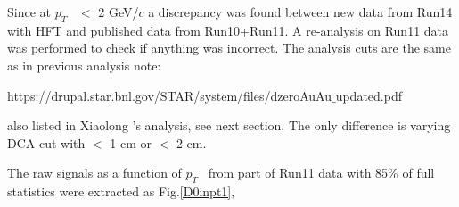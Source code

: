 
\newcommand{\ttbs}{\char'134}
\newcommand{\pt}{$p_{T}$ }
\newcommand{ \bfg }{\begin{figure}[]}
\newcommand{ \efg }{\end{figure}}
\newcommand{\dzero}{$D^{0}$ }




Since at \pt\ $<$ 2 GeV/$c$ a discrepancy was found between new data from Run14 with HFT and published data from Run10+Run11. A re-analysis on Run11 data was performed to check if anything was incorrect. The analysis cuts are the same as in previous analysis note:

https://drupal.star.bnl.gov/STAR/system/files/dzeroAuAu$\_$updated.pdf

also listed in Xiaolong 's analysis, see next section. The only difference is varying DCA cut with $<$ 1 cm or $<$ 2 cm.

The raw signals as a function of \pt\ from part of Run11 data with 85\% of full statistics were extracted as Fig.\ref{D0inpt1},

